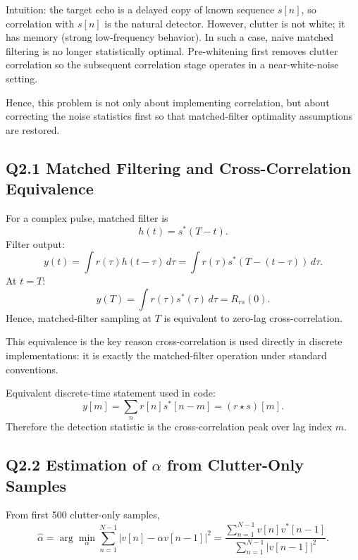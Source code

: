 \documentclass{article}
\begin{document}
Intuition: the target echo is a delayed copy of known sequence $s[n]$, so correlation with $s[n]$ is the natural detector. However, clutter is not white; it has memory (strong low-frequency behavior). In such a case, naive matched filtering is no longer statistically optimal. Pre-whitening first removes clutter correlation so the subsequent correlation stage operates in a near-white-noise setting.

Hence, this problem is not only about implementing correlation, but about correcting the noise statistics first so that matched-filter optimality assumptions are restored.

\subsection*{Q2.1 Matched Filtering and Cross-Correlation Equivalence}
For a complex pulse, matched filter is
\begin{equation*}
h(t)=s^*(T-t).
\end{equation*}
Filter output:
\begin{equation*}
y(t)=\int r(\tau)h(t-\tau)\,d\tau
=\int r(\tau)s^*(T-(t-\tau))\,d\tau.
\end{equation*}
At $t=T$:
\begin{equation*}
y(T)=\int r(\tau)s^*(\tau)\,d\tau = R_{rs}(0).
\end{equation*}
Hence, matched-filter sampling at $T$ is equivalent to zero-lag cross-correlation.

This equivalence is the key reason cross-correlation is used directly in discrete implementations: it is exactly the matched-filter operation under standard conventions.

Equivalent discrete-time statement used in code:
\begin{equation*}
y[m] = \sum_n r[n]s^*[n-m] = (r \star s)[m].
\end{equation*}
Therefore the detection statistic is the cross-correlation peak over lag index $m$.

\subsection*{Q2.2 Estimation of $\alpha$ from Clutter-Only Samples}

From first 500 clutter-only samples,
\begin{equation*}
\hat{\alpha}=\arg\min_{\alpha}\sum_{n=1}^{N-1}|v[n]-\alpha v[n-1]|^2
=\frac{\sum_{n=1}^{N-1}v[n]v^*[n-1]}{\sum_{n=1}^{N-1}|v[n-1]|^2}.
\end{equation*}
\end{document}
